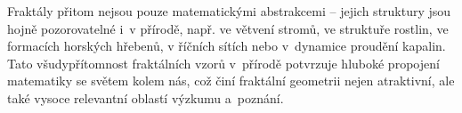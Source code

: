Fraktály přitom nejsou pouze matematickými abstrakcemi -- jejich struktury jsou hojně pozorovatelné i~v přírodě, např. ve větvení stromů, ve struktuře rostlin, ve formacích horských hřebenů, v říčních sítích nebo v~dynamice proudění kapalin. Tato všudypřítomnost fraktálních vzorů v~přírodě potvrzuje hluboké propojení matematiky se světem kolem nás, což činí fraktální geometrii nejen atraktivní, ale také vysoce relevantní oblastí výzkumu a~poznání.